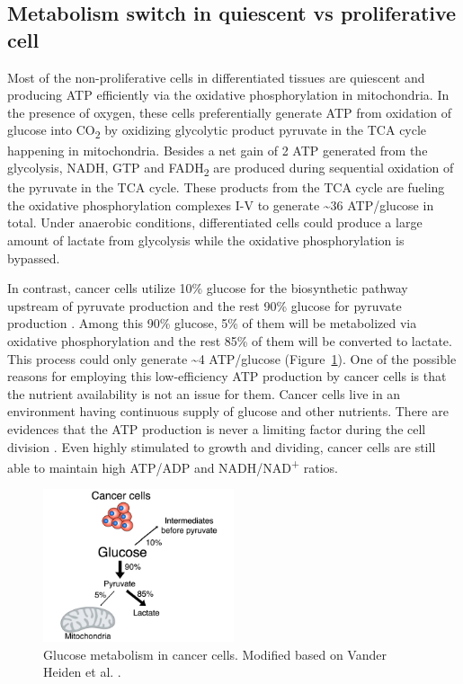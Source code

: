 \subsection{Metabolism switch in quiescent vs proliferative cell}

Most of the non-proliferative cells in differentiated tissues are quiescent and producing ATP efficiently via the oxidative phosphorylation in mitochondria. In the presence of oxygen, these cells preferentially generate ATP from oxidation of glucose into CO\textsubscript{2} by oxidizing glycolytic product pyruvate in the TCA cycle happening in mitochondria. Besides a net gain of 2 ATP generated from the glycolysis, NADH, GTP and FADH\textsubscript{2} are produced during sequential oxidation of the pyruvate in the TCA cycle. These products from the TCA cycle are fueling the oxidative phosphorylation complexes I-V to generate \textasciitilde36 ATP/glucose in total. Under anaerobic conditions, differentiated cells could produce a large amount of lactate from glycolysis while the oxidative phosphorylation is bypassed.

In contrast, cancer cells utilize 10\% glucose for the biosynthetic pathway upstream of pyruvate production and the rest 90\% glucose for pyruvate production \cite{ward_metabolic_2012,heiden_understanding_2009}. Among this 90\% glucose, 5\% of them will be metabolized via oxidative phosphorylation and the rest 85\% of them will be converted to lactate. This process could only generate \textasciitilde4 ATP/glucose (Figure~\ref{fig:fig1.4}). One of the possible reasons for employing this low-efficiency ATP production by cancer cells is that the nutrient availability is not an issue for them. Cancer cells live in an environment having continuous supply of glucose and other nutrients. There are evidences that the ATP production is never a limiting factor during the cell division \cite{deberardinis_biology_2008,christofk_m2_2008}. Even highly stimulated to growth and dividing, cancer cells are still able to maintain high ATP/ADP and NADH/NAD\textsuperscript{+} ratios.

\begin{figure}[htbp]
\centering
\includegraphics[width=0.5\textwidth]{figs/fig1-4 aerobic glycolysis.pdf}
\caption[Glucose metabolism in cancer cells]{\footnotesize Glucose metabolism in cancer cells. Modified based on Vander Heiden et al. \cite{heiden_understanding_2009}.}
\label{fig:fig1.4}
\end{figure}

